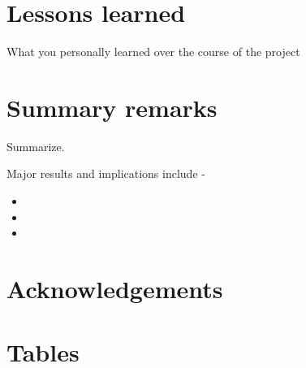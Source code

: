 \documentclass[11pt,a4paper]{article}
\makeatletter
\renewcommand\listoftables{%
    \@starttoc{lot}%
}
\makeatother
\begin{document}
\newpage


\section{Lessons learned} \label{sec-lessons}
What you personally learned over the course of the project


\newpage


\section{Summary remarks} \label{sec-summary}
Summarize. 

Major results and implications include - 
\begin{itemize}[begin-vspace=0ex,item-vspace=-0.5ex,begin-extra-vspace=1ex,para-vspace=1ex,left-margin=2.25ex,item-indent=0ex]
    \item
    \item
    \item
\end{itemize}


\newpage


\pagestyle{fancyplain}
\fancyhf{} %
\renewcommand{\headrulewidth}{0pt} %
\rfoot{\fancyplain{}{\thepage}}
\nolinenumbers


\section{Acknowledgements}


\newpage


%
%

\setlength{\bibhang}{0pt}

%


\newpage


\section{Tables}

{%
\let\oldnumberline\numberline%
\renewcommand{\numberline}{\tablename~\oldnumberline}%
\listoftables%
}

\newpage
\end{document}
